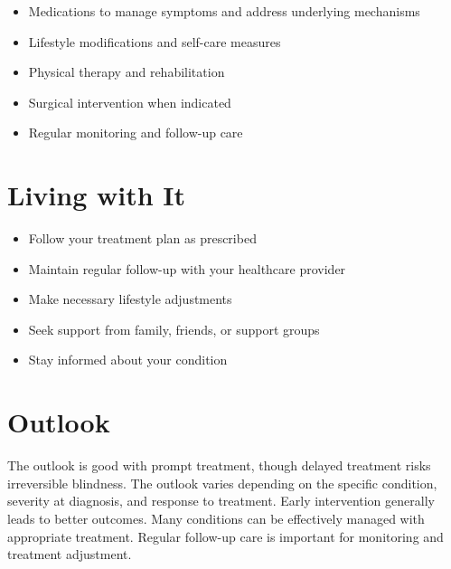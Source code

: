 \begin{itemize}[noitemsep]
  \item Medications to manage symptoms and address underlying mechanisms
  \item Lifestyle modifications and self-care measures
  \item Physical therapy and rehabilitation
  \item Surgical intervention when indicated
  \item Regular monitoring and follow-up care
\end{itemize}
\section{Living with It}
\begin{itemize}[noitemsep]
  \item Follow your treatment plan as prescribed
  \item Maintain regular follow-up with your healthcare provider
  \item Make necessary lifestyle adjustments
  \item Seek support from family, friends, or support groups
  \item Stay informed about your condition
\end{itemize}
\section{Outlook}
The outlook is good with prompt treatment, though delayed treatment risks irreversible blindness. The outlook varies depending on the specific condition, severity at diagnosis, and response to treatment. Early intervention generally leads to better outcomes. Many conditions can be effectively managed with appropriate treatment. Regular follow-up care is important for monitoring and treatment adjustment.
